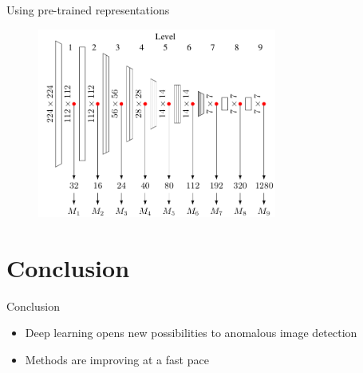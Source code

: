 \documentclass[xcolor=pdftex,dvipsnames,table,mathserif]{beamer}
\begin{document}
\begin{frame}{Using pre-trained representations~\tiny{\cite{rippel_modeling_2020}}}

\begin{figure}[ht]
  \centering
  \includegraphics[width=0.7\textwidth]{enb0_features}
\end{figure}


\end{frame}



\section{Conclusion}

\begin{frame}{Conclusion}

\begin{itemize}
\item Deep learning opens new possibilities to anomalous image detection
\item Methods are improving at a fast pace
\end{itemize}

\end{frame}



\end{document}
